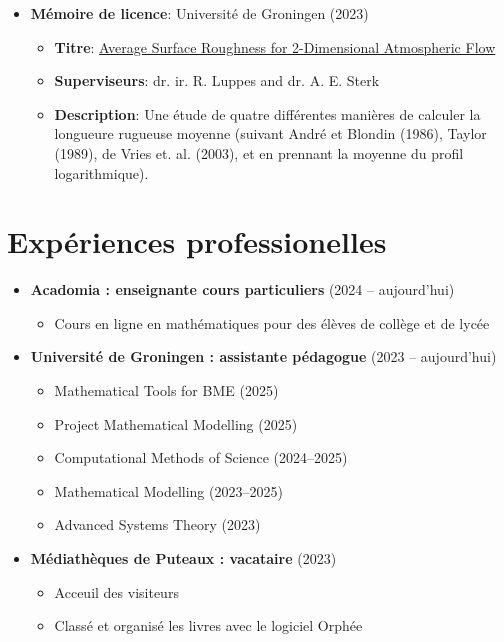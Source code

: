 \documentclass[10pt]{article}
\begin{document}
\begin{itemize}
    \item \textbf{Mémoire de licence}: Université de Groningen (2023) \begin{itemize}
        \item \textbf{Titre}: \href{https://fse.studenttheses.ub.rug.nl/30589/1/bAppM_2023_MandevilleMA.pdf}{Average Surface Roughness for 2-Dimensional Atmospheric Flow}
        \item \textbf{Superviseurs}: dr. ir. R. Luppes and dr. A. E. Sterk 
        \item \textbf{Description}: Une étude de quatre différentes manières de
        calculer la longueure rugueuse moyenne (suivant André et Blondin (1986), Taylor (1989), de Vries et. al. (2003), et en prennant la moyenne du profil logarithmique).
    \end{itemize}
\end{itemize}

\section*{Expériences professionelles}
\begin{itemize}
\item \textbf{Acadomia : enseignante cours particuliers} (2024 -- aujourd'hui)
\begin{itemize}
    \item Cours en ligne en mathématiques pour des élèves de collège et de lycée
\end{itemize}
\item \textbf{Université de Groningen : assistante pédagogue} (2023 -- aujourd'hui)
\begin{itemize}
    \item Mathematical Tools for BME (2025)
    \item Project Mathematical Modelling (2025)
    \item Computational Methods of Science (2024--2025)
    \item Mathematical Modelling (2023--2025) 
    \item Advanced Systems Theory (2023)
\end{itemize}
\item \textbf{Médiathèques de Puteaux : vacataire} (2023) 
\begin{itemize}
    \item Acceuil des visiteurs 
    \item Classé et organisé les livres avec le logiciel Orphée
\end{itemize}
\end{itemize}
\end{document}
